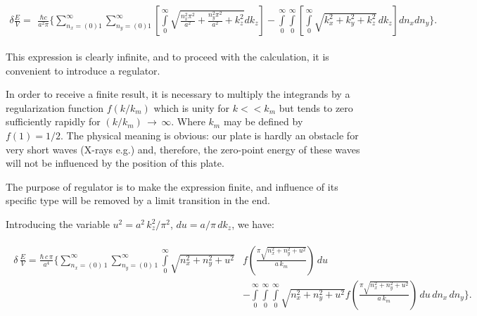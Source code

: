 \documentclass[twoside, 10pt, ptm]{article}
\begin{document}
\noindent
    \begin{equation} \label{eq:2}
\begin{array}{lr}
\delta \frac{E}{V} =
\begin{array}{c}
\frac{\hbar c}{a^2 \pi}\Bigg\{\sum\limits_{n_x=(0)1}^{\infty}\sum\limits_{n_y=(0)1}^{\infty}\left[\int\limits_{0}^{\infty}\sqrt{\frac{n_x^2 \pi^2}{a^2}+\frac{n_y^2 \pi^2}{a^2}+k_z^2} dk_z\right] %
-\int\limits_{0}^{\infty}\int\limits_{0}^{\infty}\left[\int\limits_{0}^{\infty}\sqrt{k_x^2+k_y^2+k_z^2}\,dk_z\right] dn_x dn_y\Bigg\}.
\end{array}\end{array}\end{equation}

\begin{multicols}{2}

    This expression is clearly infinite, and to proceed with the
calculation, it is convenient to introduce a regulator.

    In order to receive a finite result, it is necessary to multiply the
integrands by a regularization function \(f(k/k_m)\) which is unity for
\(k << k_m\) but tends to zero sufficiently rapidly for
\((k/k_m)\, \rightarrow\,\infty\). Where \(k_m\) may be defined by
\(f(1) = {1}/{2}\). The physical meaning is obvious: our plate is hardly an obstacle for very short
waves (X-rays e.g.) and, therefore, the zero-point energy of these waves will not be
influenced by the position of this plate.

    The purpose of regulator is to make the expression finite, and
influence of its specific type will be removed by a limit transition in the end.

    Introducing the variable \(u^2 = a^2\,k_z^2/\pi^2\),
\(du = a/\pi\,dk_z\), we have:

\end{multicols}

    \begin{equation} \label{eq:3}
\begin{array}{c}
\begin{array}{ll}
\delta\,\frac{E}{V} =
\frac{\hbar\,c\,\pi}{a^4}\Bigg\{
\sum\limits_{n_x=\left(0\right)\,1}^{\infty}
\sum\limits_{n_y=\left(0\right)\,1}^{\infty}
\int\limits_{0}^{\infty}
{\sqrt{n_x^2 + n_y^2 + u^2}} &
f\left(\frac{\pi\sqrt{n_x^2 + n_y^2 + u^2}}{a\,k_m}\right)
\,d{u} \\
\, &- \int\limits_{0}^{\infty}
\int\limits_{0}^{\infty}
\int\limits_{0}^{\infty}
{\sqrt{n_x^2 + n_y^2 + u^2}}
f\left(\frac{\pi\sqrt{n_x^2 + n_y^2 + u^2}}{a\,k_m}\right)
\,d{u}\,d{n_x}\,d{n_y}
\Bigg\}.
\end{array}
\end{array}
\end{equation}
\end{document}
